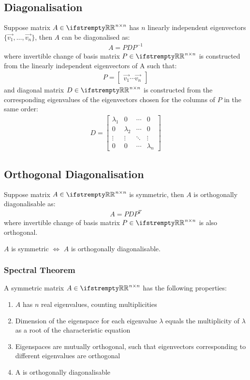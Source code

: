 \documentclass[12pt, a4paper]{article}
\begin{document}
\begin{multicols*}{3}
\subsection{Diagonalisation}
Suppose matrix $A \in \RR^{n{\times}n}$ has $n$ linearly independent eigenvectors $\{\vec{v_1},\ldots,\vec{v_n}\}$, then $A$ can be diagonalised as:
\begin{align*}
  A = PDP^{-1}
\end{align*}
where invertible change of basis matrix $P \in \RR^{n{\times}n}$ is constructed from the linearly independent eigenvectors of A such that:
\begin{align*}
  P = \begin{bmatrix}\vec{v_1} \cdots \vec{v_n}\end{bmatrix}
\end{align*}
and diagonal matrix $D \in \RR^{n{\times}n}$ is constructed from the corresponding eigenvalues of the eigenvectors chosen for the columns of $P$ in the same order:
\begin{align*}
  D = \begin{bmatrix}\lambda_1 & 0 & \cdots & 0\\ 0 & \lambda_2 & \cdots & 0\\ \vdots & \vdots & \ddots & \vdots \\ 0 & 0 & \cdots & \lambda_n \end{bmatrix}
\end{align*}

\subsection{Orthogonal Diagonalisation}
Suppose matrix $A \in \RR^{n{\times}n}$ is symmetric, then $A$ is orthogonally diagonalisable as:
\begin{align*}
  A = PDP^T
\end{align*}
where invertible change of basis matrix $P \in \RR^{n{\times}n}$ is also orthogonal. 

$A$ is symmetric $\iff$ $A$ is orthogonally diagonalisable.

\subsubsection{Spectral Theorem}
A symmetric matrix $A \in \RR^{n{\times}n}$ has the following properties:
\begin{enumerate}[\roman*.]
  \item $A$ has $n$ real eigenvalues, counting multiplicities
  \item Dimension of the eigenspace for each eigenvalue $\lambda$ equals the multiplicity of $\lambda$ as a root of the characteristic equation
  \item Eigenspaces are mutually orthogonal, such that eigenvectors corresponding to different eigenvalues are orthogonal
  \item A is orthogonally diagonalisable
\end{enumerate}


\end{multicols*}
\end{document}
